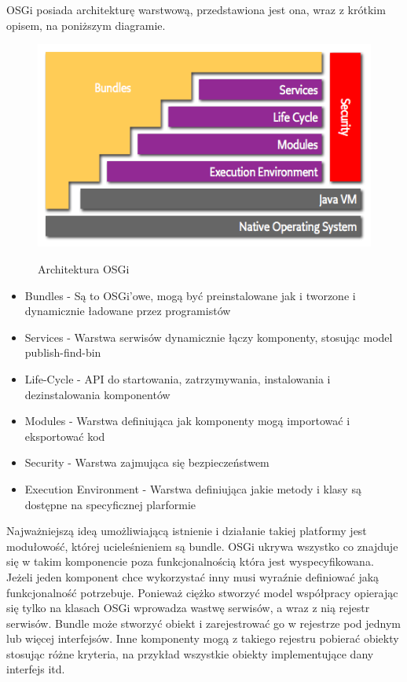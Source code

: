 OSGi posiada architekturę warstwową, przedstawiona jest ona, wraz z krótkim opisem, na poniższym diagramie.
\newpage
\begin{figure}[!h]
	\centering
	\includegraphics[scale=0.65]{osgiArchitektura.png} 
	\cite{fusehomepage2012}
	\caption{Architektura OSGi}
\end{figure}
\begin{itemize}
	\item Bundles - Są to OSGi'owe, mogą być preinstalowane jak i tworzone i dynamicznie ładowane przez programistów
	\item Services - Warstwa serwisów dynamicznie łączy komponenty, stosując model publish-find-bin
	\item Life-Cycle - API do startowania, zatrzymywania, instalowania i dezinstalowania komponentów
	\item Modules - Warstwa definiująca jak komponenty mogą importować i eksportować kod	
	\item Security - Warstwa zajmująca się bezpieczeństwem
	\item Execution Environment - Warstwa definiująca jakie metody i klasy są dostępne na specyficznej plarformie
\end{itemize}  
Najważniejszą ideą umożliwiającą istnienie i działanie takiej platformy jest modułowość, której ucieleśnieniem są bundle. OSGi ukrywa wszystko co znajduje się w takim komponencie poza funkcjonalnością która jest wyspecyfikowana. Jeżeli jeden komponent chce wykorzystać inny musi wyraźnie definiować jaką funkcjonalność potrzebuje. Ponieważ ciężko stworzyć model współpracy opierając się tylko na klasach OSGi wprowadza wastwę serwisów, a wraz z nią rejestr serwisów. Bundle może stworzyć obiekt i zarejestrować go w rejestrze pod jednym lub więcej interfejsów. Inne komponenty mogą z takiego rejestru pobierać obiekty stosując różne kryteria, na przykład wszystkie obiekty implementujące dany interfejs itd.
